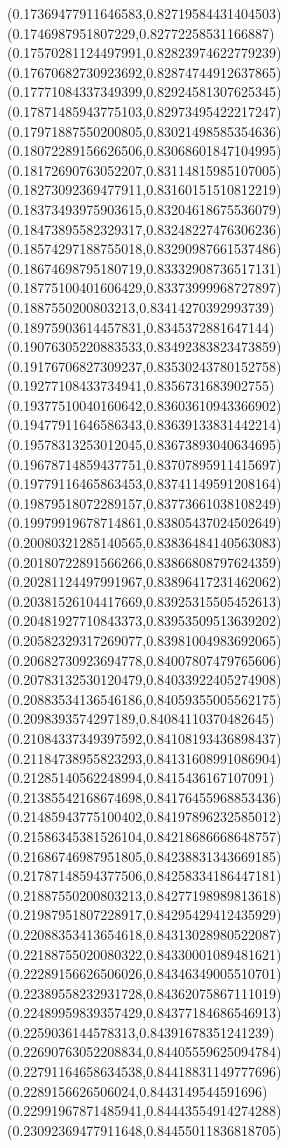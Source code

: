 \documentclass[12pt]{article}
\theoremstyle{plain}
\theoremstyle{definition}
\theoremstyle{remark}
\begin{document}
\begin{figure}
{  (0.17369477911646583,0.82719584431404503)%
  (0.1746987951807229,0.82772258531166887)%
  (0.17570281124497991,0.82823974622779239)%
  (0.17670682730923692,0.82874744912637865)%
  (0.17771084337349399,0.82924581307625345)%
  (0.17871485943775103,0.82973495422217247)%
  (0.17971887550200805,0.83021498585354636)%
  (0.18072289156626506,0.83068601847104995)%
  (0.18172690763052207,0.83114815985107005)%
  (0.18273092369477911,0.83160151510812219)%
  (0.18373493975903615,0.83204618675536079)%
  (0.18473895582329317,0.83248227476306236)%
  (0.18574297188755018,0.83290987661537486)%
  (0.18674698795180719,0.83332908736517131)%
  (0.18775100401606429,0.83373999968727897)%
  (0.1887550200803213,0.83414270392993739)%
  (0.18975903614457831,0.8345372881647144)%
  (0.19076305220883533,0.83492383823473859)%
  (0.19176706827309237,0.83530243780152758)%
  (0.19277108433734941,0.8356731683902755)%
  (0.19377510040160642,0.83603610943366902)%
  (0.19477911646586343,0.83639133831442214)%
  (0.19578313253012045,0.83673893040634695)%
  (0.19678714859437751,0.83707895911415697)%
  (0.19779116465863453,0.83741149591208164)%
  (0.19879518072289157,0.83773661038108249)%
  (0.19979919678714861,0.83805437024502649)%
  (0.20080321285140565,0.83836484140563083)%
  (0.20180722891566266,0.83866808797624359)%
  (0.20281124497991967,0.83896417231462062)%
  (0.20381526104417669,0.83925315505452613)%
  (0.20481927710843373,0.83953509513639202)%
  (0.20582329317269077,0.83981004983692065)%
  (0.20682730923694778,0.84007807479765606)%
  (0.20783132530120479,0.84033922405274908)%
  (0.20883534136546186,0.84059355005562175)%
  (0.2098393574297189,0.84084110370482645)%
  (0.21084337349397592,0.84108193436898437)%
  (0.21184738955823293,0.84131608991086904)%
  (0.21285140562248994,0.8415436167107091)%
  (0.21385542168674698,0.84176455968853436)%
  (0.21485943775100402,0.84197896232585012)%
  (0.21586345381526104,0.84218686668648757)%
  (0.21686746987951805,0.84238831343669185)%
  (0.21787148594377506,0.84258334186447181)%
  (0.21887550200803213,0.84277198989813618)%
  (0.21987951807228917,0.84295429412435929)%
  (0.22088353413654618,0.84313028980522087)%
  (0.22188755020080322,0.84330001089481621)%
  (0.22289156626506026,0.84346349005510701)%
  (0.22389558232931728,0.84362075867111019)%
  (0.22489959839357429,0.84377184686546913)%
  (0.2259036144578313,0.84391678351241239)%
  (0.22690763052208834,0.84405559625094784)%
  (0.22791164658634538,0.84418831149777696)%
  (0.2289156626506024,0.8443149544591696)%
  (0.22991967871485941,0.84443554914274288)%
  (0.23092369477911648,0.84455011836818705)%
}
\end{figure}
\end{document}
